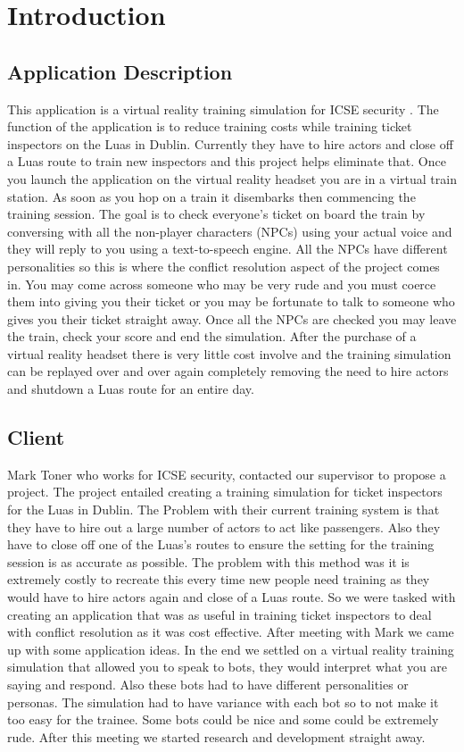 \chapter{Introduction}

\section{Application Description}
This application is a virtual reality training simulation for ICSE security . The function of the application is to reduce training costs while training ticket inspectors on the Luas in Dublin. Currently they have to hire actors and close off a Luas route to train new inspectors and this project helps eliminate that. Once you launch the application on the virtual reality headset you are in a virtual train station. As soon as you hop on a train it disembarks then commencing the training session. The goal is to check everyone's ticket on board the train by conversing with all the non-player characters (NPCs) using your actual voice and they will reply to you using a text-to-speech engine. All the NPCs have different personalities so this is where the conflict resolution aspect of the project comes in. You may come across someone who may be very rude and you must coerce them into giving you their ticket or you may be fortunate to talk to someone who gives you their ticket straight away. Once all the NPCs are checked you may leave the train, check your score and end the simulation. After the purchase of a virtual reality headset there is very little cost involve and the training simulation can be replayed over and over again completely removing the need to hire actors and shutdown a Luas route for an entire day.  

\section{Client}
Mark Toner who works for ICSE security, contacted our supervisor to propose a project. The project entailed creating a training simulation for ticket inspectors for the Luas in Dublin. The Problem with their current training system is that they have to hire out a large number of actors to act like passengers. Also they have to close off one of the Luas's routes to ensure the setting for the training session is as accurate as possible. The problem with this method was it is extremely costly to recreate this every time new people need training as they would have to hire actors again and close of a Luas route. So we were tasked with creating an application that was as useful in training ticket inspectors to deal with conflict resolution as it was cost effective. After meeting with Mark we came up with some application ideas. In the end we settled on a virtual reality training simulation that allowed you to speak to bots, they would interpret what you are saying and respond. Also these bots had to have different personalities or personas. The simulation had to have variance with each bot so to not make it too easy for the trainee. Some bots could be nice and some could be extremely rude. After this meeting we started research and development straight away.

